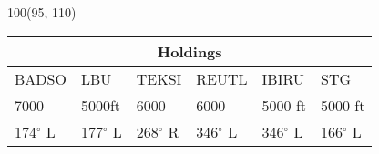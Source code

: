 \documentclass[10pt,landscape,a4paper]{article}
\begin{document}
\begin{textblock}{100}(95, 110)
\begin{table}[]
\begin{tabular}{|l|l|l|l|l|l|}
\multicolumn{6}{c}{\textbf{Holdings}} \\ \hline
BADSO & LBU & TEKSI & REUTL & IBIRU & STG \\ \hline
7000 & 5000ft & 6000 & 6000 & 5000 ft & 5000 ft \\
174$^\circ$ L & 177$^\circ$ L & 268$^\circ$ R & 346$^\circ$ L & 346$^\circ$ L & 166$^\circ$ L \\ \hline
\end{tabular}
\end{table}
\end{textblock}
\end{document}

